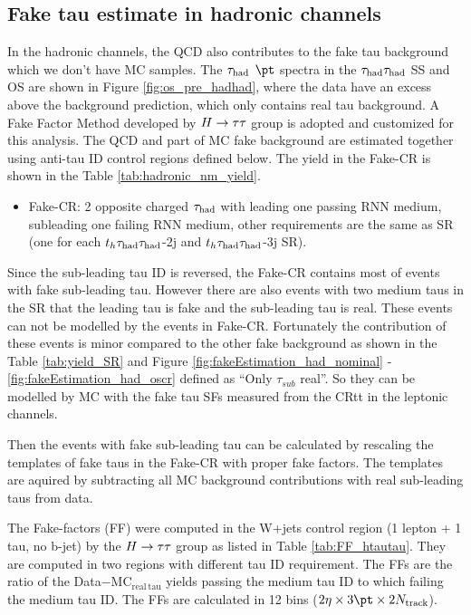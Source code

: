 \newpage
\subsection{Fake tau estimate in hadronic channels}
\label{sec:ss_method}

In the hadronic channels, the QCD also contributes to the fake tau background which we don't have MC samples. The $\tau_\text{had}$ $\pt$ spectra in the $\tau_\text{had}{}\tau_\text{had}$ SS and OS are shown in Figure \ref{fig:os_pre_hadhad}, where the data have an excess above the background prediction, which only contains real tau background. A Fake Factor Method developed by $H \rightarrow \tau\tau$ group \cite{Htautau-note} is adopted and customized for this analysis. The QCD and part of MC fake background are estimated together using anti-tau ID control regions defined below. The yield in the Fake-CR is shown in the Table \ref{tab:hadronic_nm_yield}. 

\begin{itemize}
\item{Fake-CR: 2 opposite charged $\tau_\text{had}$ with leading one passing RNN medium, subleading one failing RNN medium, other requirements are the same as SR (one for each  $t_h\tau_\text{had}{}\tau_\text{had}$-2j and $t_h\tau_\text{had}{}\tau_\text{had}$-3j SR).}
\end{itemize}



Since the sub-leading tau ID is reversed, the Fake-CR contains most of events with fake sub-leading tau.
However there are also events with two medium taus in the SR that the leading tau is fake and the sub-leading tau is real.
These events can not be modelled by the events in Fake-CR. Fortunately the contribution of these events is minor compared to the other fake background as shown in the Table \ref{tab:yield_SR} and Figure \ref{fig:fakeEstimation_had_nominal} - \ref{fig:fakeEstimation_had_oscr} defined as ``Only $\tau_{sub}$ real''. So they can be modelled by MC with the fake tau SFs measured from the
CRtt in the leptonic channels.

Then the events with fake sub-leading tau can be calculated by rescaling the templates of fake taus in the Fake-CR with proper fake factors. The templates are aquired by subtracting all MC background contributions with real sub-leading taus from data.

The Fake-factors (FF) were computed in the W+jets control region (1 lepton + 1 tau, no b-jet) by the $H \rightarrow \tau\tau$ group \cite{Htautau-note} as listed in Table \ref{tab:FF_htautau}. They are computed in two regions with different tau ID requirement. The FFs are the ratio of the Data$-$MC$_\mathrm{real~tau}$ yields passing the medium tau ID to which failing the medium tau ID. The FFs are calculated in 12 bins ($2\eta\times3\pt\times2N_\mathrm{track}$).

